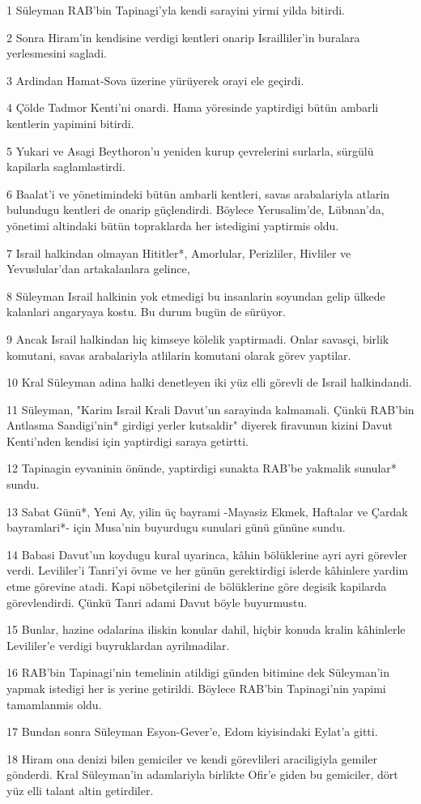 \par 1 Süleyman RAB'bin Tapinagi'yla kendi sarayini yirmi yilda bitirdi.
\par 2 Sonra Hiram'in kendisine verdigi kentleri onarip Israilliler'in buralara yerlesmesini sagladi.
\par 3 Ardindan Hamat-Sova üzerine yürüyerek orayi ele geçirdi.
\par 4 Çölde Tadmor Kenti'ni onardi. Hama yöresinde yaptirdigi bütün ambarli kentlerin yapimini bitirdi.
\par 5 Yukari ve Asagi Beythoron'u yeniden kurup çevrelerini surlarla, sürgülü kapilarla saglamlastirdi.
\par 6 Baalat'i ve yönetimindeki bütün ambarli kentleri, savas arabalariyla atlarin bulundugu kentleri de onarip güçlendirdi. Böylece Yerusalim'de, Lübnan'da, yönetimi altindaki bütün topraklarda her istedigini yaptirmis oldu.
\par 7 Israil halkindan olmayan Hititler*, Amorlular, Perizliler, Hivliler ve Yevuslular'dan artakalanlara gelince,
\par 8 Süleyman Israil halkinin yok etmedigi bu insanlarin soyundan gelip ülkede kalanlari angaryaya kostu. Bu durum bugün de sürüyor.
\par 9 Ancak Israil halkindan hiç kimseye kölelik yaptirmadi. Onlar savasçi, birlik komutani, savas arabalariyla atlilarin komutani olarak görev yaptilar.
\par 10 Kral Süleyman adina halki denetleyen iki yüz elli görevli de Israil halkindandi.
\par 11 Süleyman, "Karim Israil Krali Davut'un sarayinda kalmamali. Çünkü RAB'bin Antlasma Sandigi'nin* girdigi yerler kutsaldir" diyerek firavunun kizini Davut Kenti'nden kendisi için yaptirdigi saraya getirtti.
\par 12 Tapinagin eyvaninin önünde, yaptirdigi sunakta RAB'be yakmalik sunular* sundu.
\par 13 Sabat Günü*, Yeni Ay, yilin üç bayrami -Mayasiz Ekmek, Haftalar ve Çardak bayramlari*- için Musa'nin buyurdugu sunulari günü gününe sundu.
\par 14 Babasi Davut'un koydugu kural uyarinca, kâhin bölüklerine ayri ayri görevler verdi. Levililer'i Tanri'yi övme ve her günün gerektirdigi islerde kâhinlere yardim etme görevine atadi. Kapi nöbetçilerini de bölüklerine göre degisik kapilarda görevlendirdi. Çünkü Tanri adami Davut böyle buyurmustu.
\par 15 Bunlar, hazine odalarina iliskin konular dahil, hiçbir konuda kralin kâhinlerle Levililer'e verdigi buyruklardan ayrilmadilar.
\par 16 RAB'bin Tapinagi'nin temelinin atildigi günden bitimine dek Süleyman'in yapmak istedigi her is yerine getirildi. Böylece RAB'bin Tapinagi'nin yapimi tamamlanmis oldu.
\par 17 Bundan sonra Süleyman Esyon-Gever'e, Edom kiyisindaki Eylat'a gitti.
\par 18 Hiram ona denizi bilen gemiciler ve kendi görevlileri araciligiyla gemiler gönderdi. Kral Süleyman'in adamlariyla birlikte Ofir'e giden bu gemiciler, dört yüz elli talant altin getirdiler.

